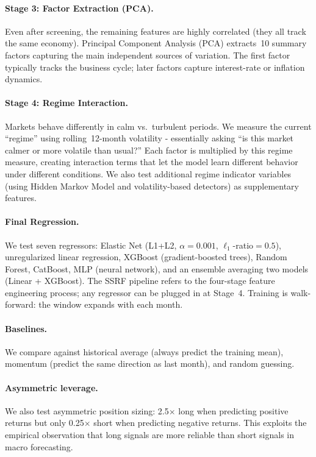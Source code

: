 \documentclass{article}
\begin{document}
\paragraph{Stage 3: Factor Extraction (PCA).}
Even after screening, the remaining features are highly correlated (they all
track the same economy). Principal Component Analysis (PCA) extracts~10
summary factors capturing the main independent sources of variation. The first
factor typically tracks the business cycle; later factors capture interest-rate
or inflation dynamics.

\paragraph{Stage 4: Regime Interaction.}
Markets behave differently in calm vs.\ turbulent periods. We measure the
current ``regime'' using rolling~12-month volatility - essentially asking
``is this market calmer or more volatile than usual?'' Each factor is
multiplied by this regime measure, creating interaction terms that let the
model learn different behavior under different conditions. We also test
additional regime indicator variables (using Hidden Markov Model and
volatility-based detectors) as supplementary features.

\paragraph{Final Regression.}
We test seven regressors: Elastic Net \citep{zou2005regularization} (L1+L2,
$\alpha=0.001$, $\ell_1$-ratio$=0.5$), unregularized linear regression,
XGBoost (gradient-boosted trees), Random Forest, CatBoost, MLP (neural
network), and an ensemble averaging two models (Linear + XGBoost). The SSRF pipeline refers to
the four-stage feature engineering process; any regressor can be plugged in
at Stage~4. Training is walk-forward: the window expands with each month.

\paragraph{Baselines.}
We compare against historical average (always predict the training mean),
momentum (predict the same direction as last month), and random guessing.

\paragraph{Asymmetric leverage.}
We also test asymmetric position sizing: 2.5$\times$ long when predicting
positive returns but only 0.25$\times$ short when predicting negative returns.
This exploits the empirical observation that long signals are more reliable
than short signals in macro forecasting.
\end{document}
